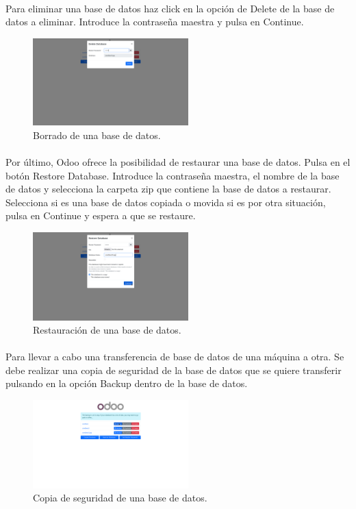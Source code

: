 \documentclass[paper=a4wide, fontsize=11pt]{report}	 %
\begin{document}
\paragraph{}
Para eliminar una base de datos haz click en la opción de Delete de la base de datos a eliminar. Introduce la contraseña maestra y pulsa en Continue.
\begin{figure}[h]
    \centering
    \includegraphics[width=6cm]{eliminarDb.png}
    \caption{Borrado de una base de datos.}
    \label{fig:faqs}
\end{figure}
\paragraph{}
Por último, Odoo ofrece la posibilidad de restaurar una base de datos. Pulsa en el botón Restore Database. Introduce la contraseña maestra, el nombre de la base de datos y selecciona la carpeta zip que contiene la base de datos a restaurar. Selecciona si es una base de datos copiada o movida si es por otra situación, pulsa en Continue y espera a que se restaure.
\newpage
\begin{figure}[h]
    \centering
    \includegraphics[width=6cm]{restaurarDb.png}
    \caption{Restauración de una base de datos.}
    \label{fig:faqs}
\end{figure}
\paragraph{}
Para llevar a cabo una transferencia de base de datos de una máquina a otra. Se debe realizar una copia de seguridad de la base de datos que se quiere transferir pulsando en la opción Backup dentro de la base de datos. 
\begin{figure}[h]
    \centering
    \includegraphics[width=6cm]{backupDb.png}
    \caption{Copia de seguridad de una base de datos.}
    \label{fig:faqs}
\end{figure}
\end{document}
